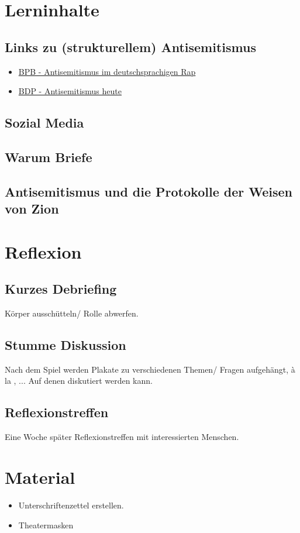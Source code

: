 \documentclass[12pt, a4paper, openany]{report}
\begin{document}
\chapter{Lerninhalte}
\section{Links zu (strukturellem) Antisemitismus}
\begin{itemize}
    \item \href{https://www.bpb.de/politik/extremismus/antisemitismus/285539/antisemitismus-im-deutschsprachigen-rap-und-pop}{BPB - Antisemitismus im deutschsprachigen Rap}
    \item \href{https://www.bpb.de/politik/extremismus/antisemitismus/37974/antisemitismus-heute}{BDP - Antisemitismus heute}
\end{itemize}

\section{Sozial Media}
\section{Warum Briefe}
\section{Antisemitismus und die Protokolle der Weisen von Zion}

\chapter{Reflexion}
\section{Kurzes Debriefing}
Körper ausschütteln/ Rolle abwerfen.

\section{Stumme Diskussion}
Nach dem Spiel werden Plakate zu verschiedenen Themen/ Fragen aufgehängt, à la , ... Auf denen  diskutiert werden kann.

\section{Reflexionstreffen}
Eine Woche später Reflexionstreffen mit interessierten Menschen.

\chapter{Material}
\begin{itemize}
    \item Unterschriftenzettel erstellen.
    \item Theatermasken
\end{itemize}

\printbibliography
\listoftodos
\end{document}
